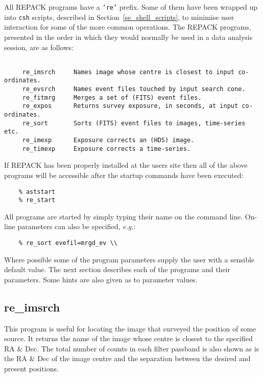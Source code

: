 All REPACK programs have a {\tt `re'} prefix.  Some of them have been
wrapped up into {\tt csh} scripts, described in
Section~\ref{se_shell_scripts}, to minimise user interaction for some
of the more common operations.  The REPACK programs, presented in the
order in which they would normally be used in a data analysis session,
are as follows:

\begin{verbatim}

     re_imsrch     Names image whose centre is closest to input co-ordinates.
     re_evsrch     Names event files touched by input search cone.
     re_fitmrg     Merges a set of (FITS) event files.
     re_expos      Returns survey exposure, in seconds, at input co-ordinates.
     re_sort       Sorts (FITS) event files to images, time-series etc.
     re_imexp      Exposure corrects an (HDS) image.
     re_timexp     Exposure corrects a time-series.

\end{verbatim}

If REPACK has been properly installed at the users site then all of the
above programs will be accessible after the startup commands have been
executed:

\begin{verbatim}
    % aststart
    % re_start
\end{verbatim}

All programs are started by simply typing their name on the command line.
On-line parameters can also be specified, \emph{e.g.}: 

\begin{verbatim} 
    % re_sort evefil=mrgd_ev \\
\end{verbatim}  

Where possible some of the program parameters supply the user with a
sensible default value.  The next section describes each of the
programs and their parameters.  Some hints are also given as to
parameter values.

\subsection{\label{ss_re_imsrch}re\_imsrch}

This program is useful for locating the image that surveyed the
position of some source.  It returns the name of the image whose centre
is closest to the specified RA \& Dec.  The total number of counts in
each filter passband is also shown as is the RA \& Dec of the image
centre and the separation between the desired and present positions.


